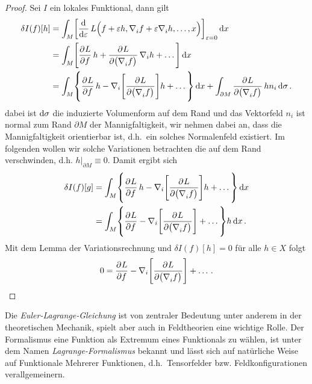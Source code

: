 \begin{proof}
Sei $I$ ein lokales Funktional, dann gilt
\begin{equation}
\begin{split}
\delta {I}(f)[h]&=\int_M \left[\dod{}{\varepsilon}L\Big(f+\varepsilon
h,\tensor{\nabla}{_i} f+\varepsilon\tensor{\nabla}{_i} h,\dots,x\Big)
\right]_{\varepsilon=0}
\dif x\\
&=\int_M
\left[\dpd{L}{f}h+\dpd{L}{\left(\tensor{\nabla}{_i}f\right)}\nabla_i
h+\dots\right] \dif x\\
&=\int_M
\left\{\dpd{L}{f}h-\nabla_i\left[\dpd{L}{\left(\tensor{\nabla}{_i}f\right)}\right]
h+\dots\right\} \dif x+\int_{\partial
M}\dpd{L}{\left(\tensor{\nabla}{_i}f\right)}h n_i\dif \sigma \,.
\end{split}
\end{equation}
dabei ist $\dif \sigma $ die induzierte Volumenform auf dem Rand und 
das Vektorfeld $n_i$ ist normal zum Rand
$\partial M$ der Mannigfaltigkeit, wir nehmen dabei an, dass die
Mannigfaltigkeit orientierbar ist, d.h.\ ein solches Normalenfeld existiert.
Im folgenden wollen wir solche Variationen betrachten die auf dem Rand
verschwinden, d.h. $h|_{\partial M}\equiv 0$. Damit ergibt sich 
\begin{equation}
\begin{split}
\delta {I}(f)[g]&=\int_M
\left\{\dpd{L}{f}h-\nabla_i\left[\dpd{L}{\left(\tensor{\nabla}{_i}f\right)}\right]
h+\dots\right\} \dif x \\
&=\int_M
\left\{\dpd{L}{f}-\nabla_i\left[\dpd{L}{\left(\tensor{\nabla}{_i}f\right)}\right]
+\dots\right\}h \dif x \,.
\end{split}
\end{equation}
Mit dem Lemma der Variationsrechnung und $\delta I(f) [h]=0$ für alle $h\in X$
folgt
\begin{equation}
0=\dpd{L}{f}-\nabla_i\left[\dpd{L}{\left(\tensor{\nabla}{_i}f\right)}\right]
+\dots\,.
\end{equation}
\end{proof}
Die \emph{Euler-Lagrange-Gleichung} ist von zentraler Bedeutung unter anderem in der theoretischen Mechanik, 
spielt aber auch in Feldtheorien eine wichtige Rolle.
Der Formalismus eine Funktion als Extremum eines Funktionals zu wählen,
ist unter dem Namen \emph{Lagrange-Formalismus} bekannt und lässt sich auf
natürliche Weise auf Funktionale Mehrerer Funktionen, d.h.\ Tensorfelder bzw.
Feldkonfigurationen verallgemeinern.
% 
